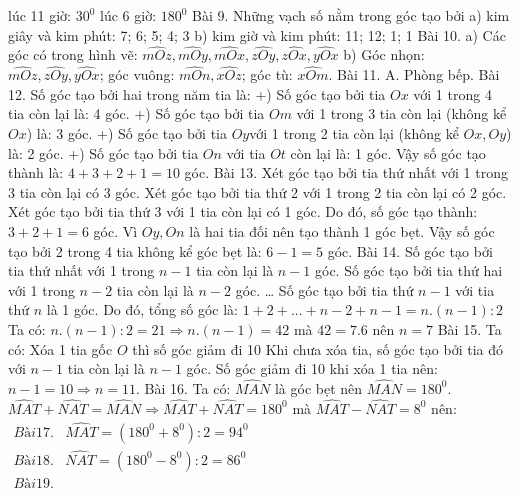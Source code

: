 lúc 11 giờ: ${{30}^{0}}$
lúc 6 giờ: ${{180}^{0}}$
Bài 9. Những vạch số nằm trong góc tạo bởi
a) kim giây và kim phút: 7; 6; 5; 4; 3
b) kim giờ và kim phút: 11; 12; 1; 1
Bài 10. 
a) Các góc có trong hình vẽ: $\widehat{mOz},\widehat{mOy},\widehat{mOx},\widehat{zOy},\widehat{zOx},\widehat{yOx}$
b) Góc nhọn: $\widehat{mOz},\widehat{zOy},\widehat{yOx}$; góc vuông: $\widehat{mOn},\widehat{xOz}$; góc tù: $\widehat{xOm}$.
Bài 11. A. Phòng bếp.
Bài 12. Số góc tạo bởi hai trong năm tia là:
+) Số góc tạo bởi tia $Ox$ với 1 trong 4 tia còn lại là: 4 góc.
+) Số góc tạo bởi tia $Om$ với 1 trong 3 tia còn lại (không kể $Ox$) là: 3 góc.
+) Số góc tạo bởi tia $Oy$với 1 trong 2 tia còn lại (không kể $Ox,Oy$) là: 2 góc.
+) Số góc tạo bởi tia $On$ với tia $Ot$ còn lại là: 1 góc.
Vậy số góc tạo thành là: $4+3+2+1=10$ góc.
Bài 13. Xét góc tạo bởi tia thứ nhất với 1 trong 3 tia còn lại có 3 góc.
Xét góc tạo bởi tia thứ 2 với 1 trong 2 tia còn lại có 2 góc.
Xét góc tạo bởi tia thứ 3 với 1 tia còn lại có 1 góc.
Do đó, số góc tạo thành: $3+2+1=6$ góc.
Vì $Oy,On$ là hai tia đối nên tạo thành 1 góc bẹt.
Vậy số góc tạo bởi 2 trong 4 tia không kể góc bẹt là: $6-1=5$ góc.
Bài 14. Số góc tạo bởi tia thứ nhất với 1 trong $n-1$ tia còn lại là $n-1$ góc.
Số góc tạo bởi tia thứ hai với 1 trong $n-2$ tia còn lại là $n-2$ góc.
…
Số góc tạo bởi tia thứ $n-1$ với tia thứ $n$ là 1 góc.
Do đó, tổng số góc là: $1+2+...+n-2+n-1=n.\left( n-1 \right):2$
Ta có: $n.\left( n-1 \right):2=21\Rightarrow n.\left( n-1 \right)=42$
mà $42=7.6$ nên $n=7$
Bài 15. Ta có:
Xóa 1 tia gốc $O$ thì số góc giảm đi 10
Khi chưa xóa tia, số góc tạo bởi tia đó với $n-1$ tia còn lại là $n-1$ góc.
Số góc giảm đi 10 khi xóa 1 tia nên: $n-1=10\Rightarrow n=11$.
Bài 16. 
Ta có: $\widehat{MAN}$ là góc bẹt nên $\widehat{MAN}={{180}^{0}}$.
$\widehat{MAT}+\widehat{NAT}=\widehat{MAN}\Rightarrow \widehat{MAT}+\widehat{NAT}={{180}^{0}}$
mà  $\widehat{MAT}-\widehat{NAT}={{8}^{0}}$  nên:
$\begin{align}
	Bài 17.   & \widehat{MAT}=\left( {{180}^{0}}+{{8}^{0}} \right):2={{94}^{0}} \\ 
	Bài 18.  & \widehat{NAT}=\left( {{180}^{0}}-{{8}^{0}} \right):2={{86}^{0}} \\ 
	Bài 19. \end{align}$

